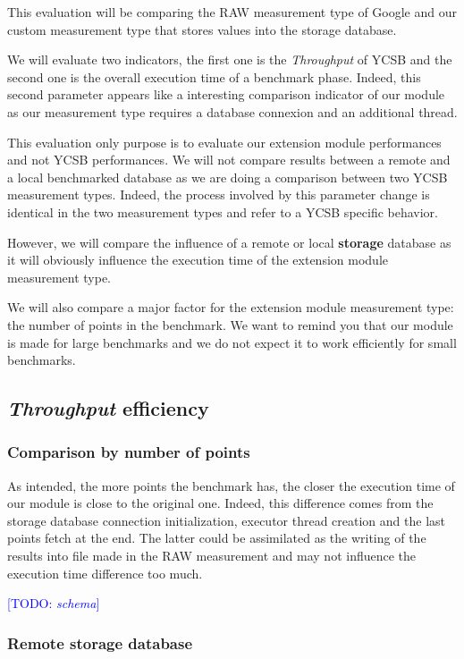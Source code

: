 \documentclass[a4paper,11pt]{report}
\newcommand*{\todo}[1]{\textcolor{blue}{[TODO: \emph{#1}]}}
\begin{document}
This evaluation will be comparing the RAW measurement type of Google and our custom measurement type that stores values into the storage database.

We will evaluate two indicators, the first one is the \textit{Throughput} of YCSB and the second one is the overall execution time of a benchmark phase. Indeed, this second parameter appears like a interesting comparison indicator of our module as our measurement type requires a database connexion and an additional thread.

\bigskip

This evaluation only purpose is to evaluate our extension module performances and not YCSB performances. We will not compare results between a remote and a local benchmarked database as we are doing a comparison between two YCSB measurement types. Indeed, the process involved by this parameter change is identical in the two measurement types and refer to a YCSB specific behavior. 

However, we will compare the influence of a remote or local \textbf{storage} database as it will obviously influence the execution time of the extension module measurement type.

We will also compare a major factor for the extension module measurement type: the number of points in the benchmark. We want to remind you that our module is made for large benchmarks and we do not expect it to work efficiently for small benchmarks.

\subsection{\textit{Throughput} efficiency}

\subsubsection{Comparison by number of points}

As intended, the more points the benchmark has, the closer the execution time of our module is close to the original one. Indeed, this difference comes from the storage database connection initialization, executor thread creation and the last points fetch at the end. The latter could be assimilated as the writing of the results into file made in the RAW measurement and may not influence the execution time difference too much.

\todo{schema}

\subsubsection{Remote storage database}
\end{document}
